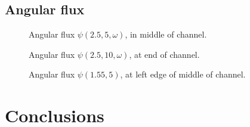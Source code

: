\documentclass{beamer}
\begin{document}
\subsection{Angular flux}
%  

\begin{frame}
\begin{figure}[tb]
  \centering
  
  \caption{Angular flux $\psi(2.5,5,\omega)$, in middle of channel.}
  \label{fig:psi5}
\end{figure}
\end{frame}

\begin{frame}
\begin{figure}[tb]
  \centering
  
  \caption{Angular flux $\psi(2.5,10,\omega)$, at end of channel.}
  \label{fig:psi10}
\end{figure}
\end{frame}

\begin{frame}
\begin{figure}[tb]
  \centering
  
  \caption{Angular flux $\psi(1.55,5)$, at left edge of middle of channel.}
  \label{fig:psiEdge}
\end{figure}
\end{frame}

\section{Conclusions}
\begin{frame}
\end{frame}
\end{document}
